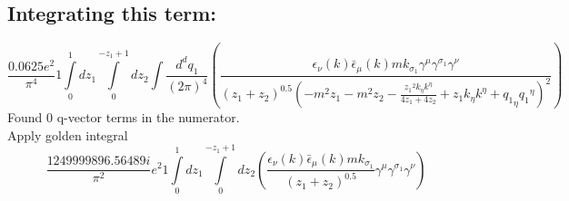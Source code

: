 \subsection*{Integrating this term:}
\begin{dmath}\frac{0.0625 e^{2}}{\pi^{4}}1\int\limits_{ 0 }^{ 1 } d{ z_{ 1 } }\int\limits_{ 0 }^{ - { z_{ 1 } } + 1 } d{ z_{ 2 } }\int\frac{d^d q_1 }{ (2\pi)^4 }\left(\frac{\epsilon_{ \nu }({ k }) \bar{\epsilon}_{ \mu }({ k }) m { { k }_{ \sigma_1 } } { \gamma^{ \mu } } { \gamma^{ \sigma_1 } } { \gamma^{ \nu } }}{\left({ z_{ 1 } } + { z_{ 2 } }\right)^{0.5} \left(- m^{2} { z_{ 1 } } - m^{2} { z_{ 2 } } - \frac{{ z_{ 1 } }^{2} { { k }_{ \eta } } { { k }^{ \eta } }}{4 { z_{ 1 } } + 4 { z_{ 2 } }} + { z_{ 1 } } { { k }_{ \eta } } { { k }^{ \eta } } + { { q_1 }_{ \eta } } { { q_1 }^{ \eta } }\right)^{2}}\right)\end{dmath}
Found 0 q-vector terms in the numerator.\\
Apply golden integral
\begin{dmath}\frac{1249999896.56489 i}{\pi^{2}} e^{2}1\int\limits_{ 0 }^{ 1 } d{ z_{ 1 } }\int\limits_{ 0 }^{ - { z_{ 1 } } + 1 } d{ z_{ 2 } }\left(\frac{\epsilon_{ \nu }({ k }) \bar{\epsilon}_{ \mu }({ k }) m { { k }_{ \sigma_1 } }}{\left({ z_{ 1 } } + { z_{ 2 } }\right)^{0.5}} { \gamma^{ \mu } } { \gamma^{ \sigma_1 } } { \gamma^{ \nu } }\right)\end{dmath}
